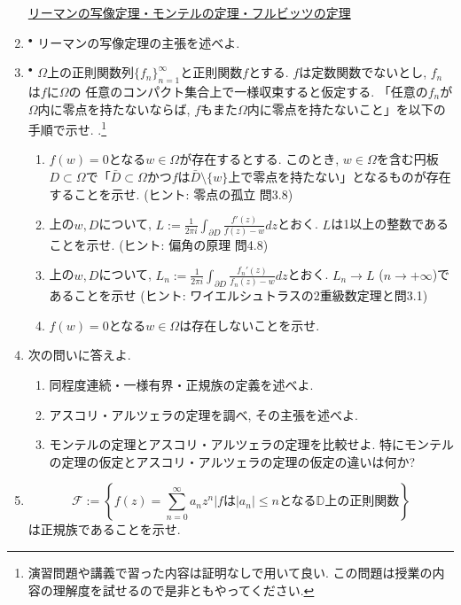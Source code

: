 \documentclass[dvipdfmx,a4paper,11pt]{article}
\newcommand{\D}{\mathbb{D}}
\theoremstyle{definition}
\begin{document}
\begin{enumerate}[label=\textbf{問}8.\arabic*]
   

\hspace{-36pt}\underline{リーマンの写像定理・モンテルの定理・フルビッツの定理}
\item $^{\bullet}$ リーマンの写像定理の主張を述べよ.
    
 \item $^{\bullet}$ $\Omega$上の正則関数列$\{ f_{n}\}_{n=1}^{\infty}$と正則関数$f$とする. $f$は定数関数でないとし, $f_n$は$f$に$\Omega$の 任意のコンパクト集合上で一様収束すると仮定する. 
「任意の$f_{n}$が$\Omega$内に零点を持たないならば, $f$もまた$\Omega$内に零点を持たないこと」を以下の手順で示せ. .\footnote{演習問題や講義で習った内容は証明なしで用いて良い. この問題は授業の内容の理解度を試せるので是非ともやってください.}
 \begin{enumerate}
\setlength{\parskip}{0cm} 
  \setlength{\itemsep}{0cm} 
  \item $f(w)=0$となる$w \in \Omega$が存在するとする. このとき, $w \in\Omega$を含む円板$D \subset \Omega$で「$\bar{D} \subset \Omega$かつ$f$は$\bar{D} \setminus \{ w\}$上で零点を持たない」となるものが存在することを示せ. (ヒント: 零点の孤立 問3.8)
  \item 上の$w, D$について, $L := \frac{1}{2 \pi i} \int_{\partial D}\frac{f'(z)}{f(z) - w} dz$とおく. $L$は1以上の整数であることを示せ. (ヒント: 偏角の原理 問4.8)
  \item 上の$w, D$について, $L_{n} :=  \frac{1}{2 \pi i} \int_{\partial D}\frac{f_{n}'(z)}{f_{n}(z) - w} dz$とおく. $L_{n} \to L$ ($n \to + \infty$)であることを示せ (ヒント: ワイエルシュトラスの2重級数定理と問3.1)
  \item $f(w)=0$となる$w \in \Omega$は存在しないことを示せ.
 \end{enumerate} 
    
\item 次の問いに答えよ.
 \begin{enumerate}
\setlength{\parskip}{0cm} 
  \setlength{\itemsep}{0cm} 
  \item 同程度連続・一様有界・正規族の定義を述べよ.
  \item アスコリ・アルツェラの定理を調べ, その主張を述べよ.
  \item モンテルの定理とアスコリ・アルツェラの定理を比較せよ. 特にモンテルの定理の仮定とアスコリ・アルツェラの定理の仮定の違いは何か?
    \end{enumerate} 

\item $$\mathcal{F} := \left\{ f(z) = \sum_{n=0}^{\infty}a_n z^n | \text{$f$は$|a_n| \le n$となる$\D$上の正則関数}\right\}$$
は正規族であることを示せ.
  

\end{enumerate}
\end{document}
